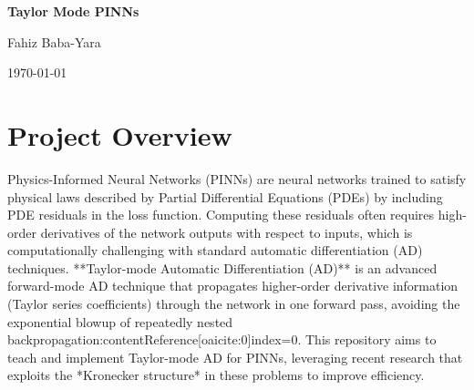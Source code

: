 \documentclass[11pt]{article}
\begin{document}
\begin{titlepage}
    \centering
    {\LARGE \textbf{Taylor Mode PINNs}\par}
    \vspace{1cm}
    {\Large Fahiz Baba-Yara\par}
    \vfill
    {\large \today\par}
\end{titlepage}

\hypersetup{hidelinks}
\tableofcontents
\newpage

\section{Project Overview}

Physics-Informed Neural Networks (PINNs) are neural networks trained to satisfy physical laws described by Partial Differential Equations (PDEs) by including PDE residuals in the loss function. Computing these residuals often requires high-order derivatives of the network outputs with respect to inputs, which is computationally challenging with standard automatic differentiation (AD) techniques. **Taylor-mode Automatic Differentiation (AD)** is an advanced forward-mode AD technique that propagates higher-order derivative information (Taylor series coefficients) through the network in one forward pass, avoiding the exponential blowup of repeatedly nested backpropagation:contentReference[oaicite:0]{index=0}. This repository aims to teach and implement Taylor-mode AD for PINNs, leveraging recent research that exploits the *Kronecker structure* in these problems to improve efficiency.
\end{document}
